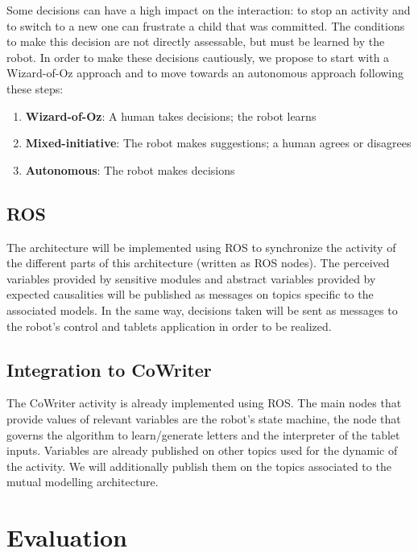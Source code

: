 \documentclass[10pt,a4paper]{article}
\begin{document}
Some decisions can have a high impact on the interaction: to stop an activity and to switch to a new one can frustrate a child that was committed. 
The conditions to make this decision are not directly assessable, but must be learned by the robot. In order to make these decisions cautiously, we propose to start with a Wizard-of-Oz approach and to move towards an autonomous approach following these steps: 
\begin{enumerate}
\item \textbf{Wizard-of-Oz}: A human takes decisions; the robot learns
\item \textbf{Mixed-initiative}: The robot makes suggestions; a human agrees or disagrees
\item \textbf{Autonomous}: The robot makes decisions
\end{enumerate}


\subsection{ROS} %

The architecture will be implemented using ROS to synchronize the activity of the different parts of this architecture (written as ROS nodes). The perceived variables provided by sensitive modules and abstract variables provided by expected causalities will be published as messages on topics specific to the associated models. In the same way, decisions taken will be sent as messages to the robot's control and tablets application in order to be realized. 

\subsection{Integration to CoWriter}

The CoWriter activity is already implemented using ROS. The main nodes that provide values of relevant variables are the robot's state machine, the node that governs the algorithm to learn/generate letters and the interpreter of the tablet inputs. Variables are already published on other topics used for the dynamic of the activity. We will additionally publish them on the topics associated to the mutual modelling architecture. 

\section{Evaluation}\label{eval}
\end{document}
